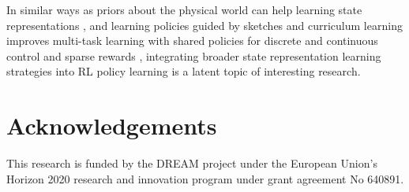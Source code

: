 \documentclass[a4paper]{article}
\begin{document}
In similar ways as priors about the physical world can help learning state representations \cite{Jonschkowski15,Lesort17}, and learning policies guided by sketches and curriculum learning improves multi-task learning %
with shared policies for discrete and continuous control and sparse rewards \cite{Andreas17}, integrating broader state representation learning strategies into RL policy learning is a latent topic of interesting research.



\section{Acknowledgements}
This research is funded by the DREAM project under the European Union's Horizon 2020 research and innovation program under grant agreement No 640891.



\end{document}
